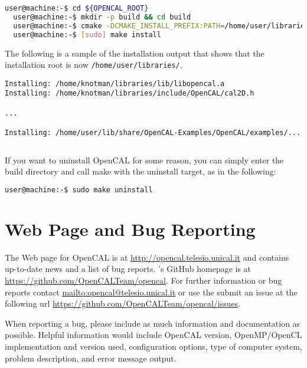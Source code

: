 \begin{lstlisting}[numbers=none,language=bash,label={ch:quickstart:sudoinstall}]
  user@machine:-$ cd ${OPENCAL_ROOT}
  user@machine:-$ mkdir -p build && cd build
  user@machine:-$ cmake -DCMAKE_INSTALL_PREFIX:PATH=/home/user/libraries/ -DBUILD_EXAMPLES=ON -DBUILD_OPENCAL_OMP=ON ..
  user@machine:-$ [sudo] make install
\end{lstlisting}
The following is a sample of the installation output that shows that the installation root is now \texttt{/home/user/libraries/}.
\begin{mdframed}
{\small
\begin{verbatim}
Installing: /home/knotman/libraries/lib/libopencal.a
Installing: /home/knotman/libraries/include/OpenCAL/cal2D.h

...

Installing: /home/user/lib/share/OpenCAL-Examples/OpenCAL/examples/...
\end{verbatim}
}
\end{mdframed}

\begin{lstlisting}[numbers=none,language=bash,label={ch:quickstart:sudoinstall}]

\end{lstlisting}

If you want to uninstall OpenCAL for some reason, you can simply enter the build directory and call make with the uninstall target, as in the following:

\begin{lstlisting}[numbers=none,language=bash,label={ch:quickstart:sudouninstall}]
  user@machine:-$ sudo make uninstall
\end{lstlisting}

\section{Web Page and Bug Reporting}

The Web page for OpenCAL is at \url{http://opencal.telesio.unical.it} and
contains up-to-date news and a list of bug reports. \ocal's GitHub
homepage is at \url{https://github.com/OpenCALTeam/opencal}. For
further information or bug reports contact
\url{mailto:opencal@telesio.unical.it} or use the submit an issue at the
following url \url{https://github.com/OpenCALTeam/opencal/issues}.

When reporting a bug, please include as much information and
documentation as possible. Helpful information would include OpenCAL
version, OpenMP/OpenCL implementation and version used,
configuration options, type of computer system, problem description,
and error message output.
